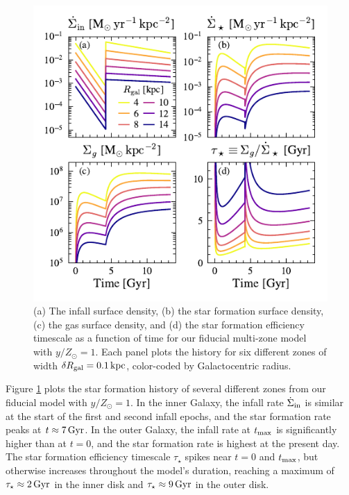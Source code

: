 \documentclass[twocolumn,twocolappendix,linenumbers]{aastex631}
\newcommand{\kpc}{\,{\rm kpc}}
\begin{document}
\begin{figure}
    \includegraphics[width=\linewidth]{figures/star_formation_history.pdf}
    \caption{(a) The infall surface density, (b) the star formation surface density, (c) the gas surface density, and (d) the star formation efficiency timescale as a function of time for our fiducial multi-zone model with $y/Z_\odot=1$. Each panel plots the history for six different zones of width $\delta R_{\rm gal}=0.1\kpc$, color-coded by Galactocentric radius.}
    \label{fig:sfh}
\end{figure}

Figure \ref{fig:sfh} plots the star formation history of several different zones from our fiducial model with $y/Z_\odot=1$. In the inner Galaxy, the infall rate $\dot\Sigma_{\rm in}$ is similar at the start of the first and second infall epochs, and the star formation rate peaks at $t\approx7\,{\rm Gyr}$. In the outer Galaxy, the infall rate at $t_{\rm max}$ is significantly higher than at $t=0$, and the star formation rate is highest at the present day. The star formation efficiency timescale $\tau_\star$ spikes near $t=0$ and $t_{\rm max}$, but otherwise increases throughout the model's duration, reaching a maximum of $\tau_\star\approx2\,{\rm Gyr}$ in the inner disk and $\tau_\star\approx 9\,{\rm Gyr}$ in the outer disk.
\end{document}
